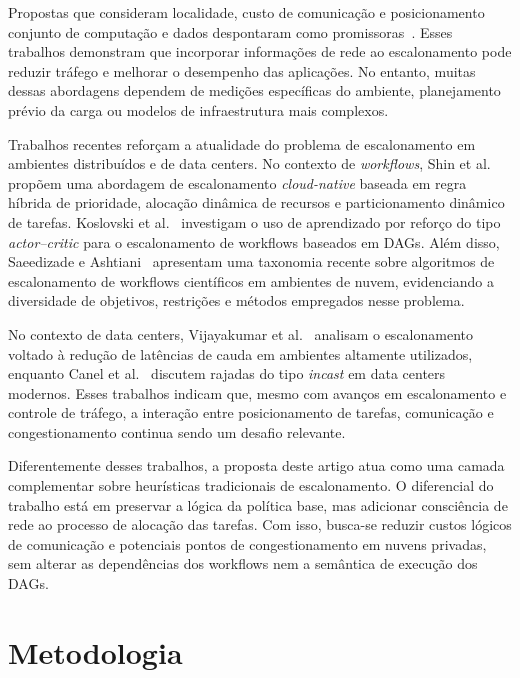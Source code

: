 \documentclass[12pt]{article}
\begin{document}
Propostas que consideram localidade, custo de comunicação e posicionamento conjunto de computação e dados despontaram como promissoras~\cite{jalaparti2015network}.
%
Esses trabalhos demonstram que incorporar informações de rede ao escalonamento pode reduzir tráfego e melhorar o desempenho das aplicações. 
%
No entanto, muitas dessas abordagens dependem de medições específicas do ambiente, planejamento prévio da carga ou modelos de infraestrutura mais complexos.

Trabalhos recentes reforçam a atualidade do problema de escalonamento em ambientes distribuídos e de data centers. 
%
No contexto de \textit{workflows}, Shin et al.~\cite{shin2024cloudnative} propõem uma abordagem de escalonamento \textit{cloud-native} baseada em regra híbrida de prioridade, alocação dinâmica de recursos e particionamento dinâmico de tarefas. 
%
Koslovski et al.~\cite{koslovski2024dag} investigam o uso de aprendizado por reforço do tipo \textit{actor--critic} para o escalonamento de workflows baseados em DAGs. 
%
Além disso, Saeedizade e Ashtiani~\cite{saeedizade2025scientific} apresentam uma taxonomia recente sobre algoritmos de escalonamento de workflows científicos em ambientes de nuvem, evidenciando a diversidade de objetivos, restrições e métodos empregados nesse problema.

No contexto de data centers, Vijayakumar et al.~\cite{vijayakumar2024reducedtail} analisam o escalonamento voltado à redução de latências de cauda em ambientes altamente utilizados, enquanto Canel et al.~\cite{canel2024understanding} discutem rajadas do tipo \textit{incast} em data centers modernos. 
%
Esses trabalhos indicam que, mesmo com avanços em escalonamento e controle de tráfego, a interação entre posicionamento de tarefas, comunicação e congestionamento continua sendo um desafio relevante.

Diferentemente desses trabalhos, a proposta deste artigo atua como uma camada complementar sobre heurísticas tradicionais de escalonamento. 
%
O diferencial do trabalho está em preservar a lógica da política base, mas adicionar consciência de rede ao processo de alocação das tarefas. 
%
Com isso, busca-se reduzir custos lógicos de comunicação e potenciais pontos de congestionamento em nuvens privadas, sem alterar as dependências dos workflows nem a semântica de execução dos DAGs.


\section{Metodologia}
\label{sec:metodologia}
\end{document}
